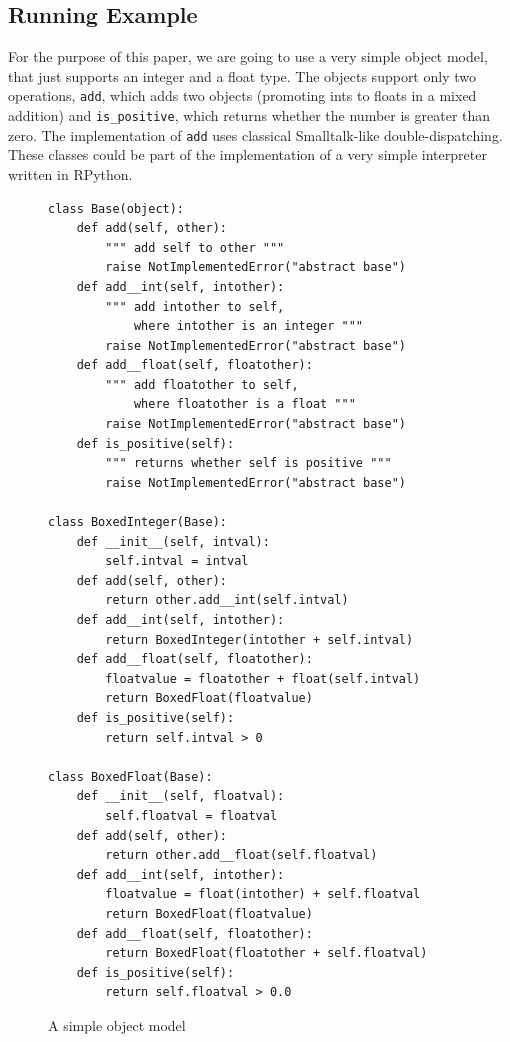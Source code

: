 \documentclass{sigplanconf}
\begin{document}
\subsection{Running Example}

For the purpose of this paper, we are going to use a very simple object
model, that just supports an integer and a float type. The objects support only
two operations, \texttt{add}, which adds two objects (promoting ints to floats in a
mixed addition) and \texttt{is\_positive}, which returns whether the number is greater
than zero. The implementation of \texttt{add} uses classical Smalltalk-like
double-dispatching. These classes could be part of the implementation of a very
simple interpreter written in RPython.

\begin{figure}
\begin{verbatim}
class Base(object):
    def add(self, other):
        """ add self to other """
        raise NotImplementedError("abstract base")
    def add__int(self, intother):
        """ add intother to self,
            where intother is an integer """
        raise NotImplementedError("abstract base")
    def add__float(self, floatother):
        """ add floatother to self,
            where floatother is a float """
        raise NotImplementedError("abstract base")
    def is_positive(self):
        """ returns whether self is positive """
        raise NotImplementedError("abstract base")

class BoxedInteger(Base):
    def __init__(self, intval):
        self.intval = intval
    def add(self, other):
        return other.add__int(self.intval)
    def add__int(self, intother):
        return BoxedInteger(intother + self.intval)
    def add__float(self, floatother):
        floatvalue = floatother + float(self.intval)
        return BoxedFloat(floatvalue)
    def is_positive(self):
        return self.intval > 0

class BoxedFloat(Base):
    def __init__(self, floatval):
        self.floatval = floatval
    def add(self, other):
        return other.add__float(self.floatval)
    def add__int(self, intother):
        floatvalue = float(intother) + self.floatval
        return BoxedFloat(floatvalue)
    def add__float(self, floatother):
        return BoxedFloat(floatother + self.floatval)
    def is_positive(self):
        return self.floatval > 0.0
\end{verbatim}
\caption{A simple object model}
\end{figure}
\end{document}
